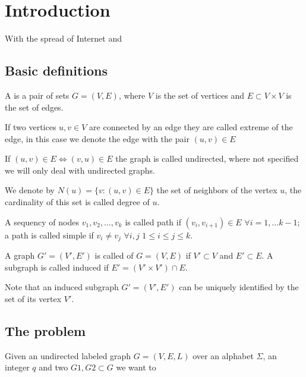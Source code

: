 
\chapter{Introduction}

With the spread of Internet and 

\section{Basic definitions}


\begin{definizione}\label{def:graph}
    A  is a pair of sets $G=(V,E)$, where $V$ is the set of vertices and $E \subset V \times V$ is the set of edges.
\end{definizione}

If two vertices $u, v \in V$ are connected by an edge they are called extreme of the edge, in this case we denote the edge with the pair $(u, v) \in E$

If $(u,v) \in E \Leftrightarrow (v,u) \in E$ the graph is called undirected, where not specified we will only deal with undirected graphs.

We denote by $N(u) = \{ v : (u,v) \in E \}$ the set of neighbors of the vertex $u$, the cardinality of this set is called degree of $u$.


A sequency of nodes  $v_{1}, v_{2}, \ldots, v_{k}$ is called path if $(v_{i}, v_{i+1}) \in E$ $\forall i = 1, \ldots k-1$; a path is called simple if $v_{i} \neq v_{j}$ $\forall i,j$ $1 \leq i \le j \leq k$.

\begin{definizione}\label{def:subgraph}
    A graph $G' = (V', E')$ is called  of $G=(V,E)$ if $V' \subset V$ and $E' \subset E$. A subgraph is called induced if $E' = (V' \times V') \cap E$.
\end{definizione}

Note that an induced subgraph $G' = (V', E')$ can be uniquely identified by the set of its vertex $V'$.


\section{The problem}

Given an undirected labeled graph $G=(V,E,L)$ over an alphabet $\Sigma$, an integer $q$
and two  $G1, G2 \subset G$ we want to 


